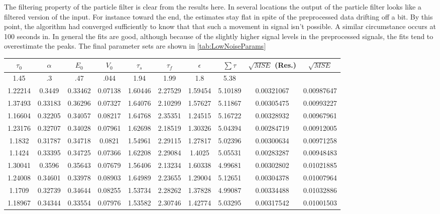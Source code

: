 The filtering property of the particle filter is clear from the results here.  In several locations the output
of the particle filter looks like a filtered version of the input. For instance toward the
end, the estimates stay flat in spite of the preprocessed data drifting off a bit. By
this point, the algorithm had converged sufficiently to know that that such a movement in
signal isn't possible. A similar circumstance occurs at 100 seconds in. 
In general the fits are good, although because
of the slightly higher signal levels in the preprocessed signals, the fits tend to overestimate
the peaks. The final parameter sets are shown in \autoref{tab:LowNoiseParams}
\begin{table}[t]
\centering
\begin{tabular}{|c | c | c | c | c | c | c | c | c | c |}
\hline 
$\tau_0$ & $\alpha$ & $E_0$    & $V_0$    & $\tau_s$ & $\tau_f$ & $\epsilon$  & $ \sum \tau $ & $\sqrt{MSE}$ (Res.) &$\sqrt{MSE}$\\
\hline 
\rowcolor[gray]{.8}
1.45 & .3 & .47 & .044 & 1.94 & 1.99 & 1.8  & 5.38 &  & \\
\hline 
\hline 
1.22214 & 0.3449 & 0.33462 & 0.07138 & 1.60446 & 2.27529 & 1.59454 & 5.10189  &  0.00321067  & 0.00987647  \\
1.37493 & 0.33183 & 0.36296 & 0.07327 & 1.64076 & 2.10299 & 1.57627 & 5.11867 &  0.00305475  & 0.00993227  \\
1.16604 & 0.32205 & 0.34057 & 0.08217 & 1.64768 & 2.35351 & 1.24515 & 5.16722 &  0.00328932  & 0.00967961  \\
1.23176 & 0.32707 & 0.34028 & 0.07961 & 1.62698 & 2.18519 & 1.30326 & 5.04394 &  0.00284719  & 0.00912005  \\
1.1832 & 0.31787 & 0.34718 & 0.0821 & 1.54961 & 2.29115 & 1.27817 & 5.02396   &  0.00300634  & 0.00971258  \\
1.1424 & 0.33395 & 0.34725 & 0.07366 & 1.62208 & 2.29084 & 1.4025 & 5.05531   &  0.00283287  & 0.00948483  \\
1.30041 & 0.3596 & 0.35643 & 0.07679 & 1.56406 & 2.13234 & 1.60338 & 4.99681  &  0.00302802  & 0.01021885  \\
1.24008 & 0.34601 & 0.33978 & 0.08903 & 1.64989 & 2.23655 & 1.29004 & 5.12651 &  0.00304378  & 0.01007964  \\
1.1709 & 0.32739 & 0.34644 & 0.08255 & 1.53734 & 2.28262 & 1.37828 & 4.99087  &  0.00334488  & 0.01032886  \\
1.18967 & 0.34344 & 0.33554 & 0.07976 & 1.53582 & 2.30746 & 1.42774 & 5.03295 &  0.00317542  & 0.01001503  \\

\end{tabular}
\end{table}

